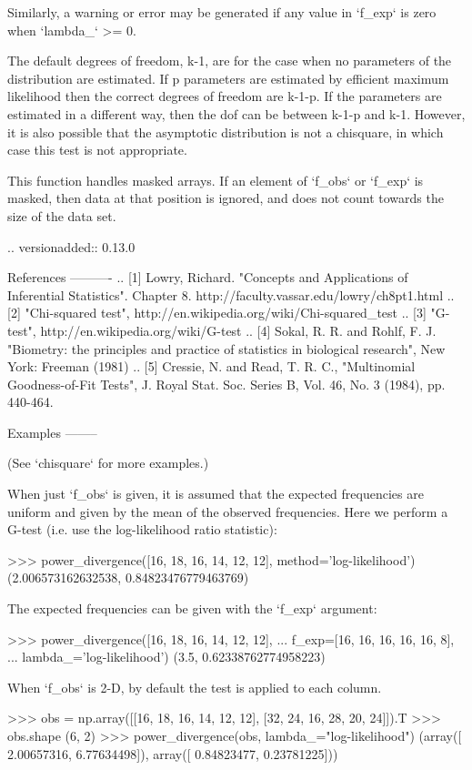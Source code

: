 \begin{DoxyVerb}
\begin{DoxyVerb}
Similarly, a warning or error may be generated if any value in `f_exp` is
zero when `lambda_` >= 0.

The default degrees of freedom, k-1, are for the case when no parameters
of the distribution are estimated. If p parameters are estimated by
efficient maximum likelihood then the correct degrees of freedom are
k-1-p. If the parameters are estimated in a different way, then the
dof can be between k-1-p and k-1. However, it is also possible that
the asymptotic distribution is not a chisquare, in which case this
test is not appropriate.

This function handles masked arrays.  If an element of `f_obs` or `f_exp`
is masked, then data at that position is ignored, and does not count
towards the size of the data set.

.. versionadded:: 0.13.0

References
----------
.. [1] Lowry, Richard.  "Concepts and Applications of Inferential
       Statistics". Chapter 8. http://faculty.vassar.edu/lowry/ch8pt1.html
.. [2] "Chi-squared test", http://en.wikipedia.org/wiki/Chi-squared_test
.. [3] "G-test", http://en.wikipedia.org/wiki/G-test
.. [4] Sokal, R. R. and Rohlf, F. J. "Biometry: the principles and
       practice of statistics in biological research", New York: Freeman
       (1981)
.. [5] Cressie, N. and Read, T. R. C., "Multinomial Goodness-of-Fit
       Tests", J. Royal Stat. Soc. Series B, Vol. 46, No. 3 (1984),
       pp. 440-464.

Examples
--------

(See `chisquare` for more examples.)

When just `f_obs` is given, it is assumed that the expected frequencies
are uniform and given by the mean of the observed frequencies.  Here we
perform a G-test (i.e. use the log-likelihood ratio statistic):

>>> power_divergence([16, 18, 16, 14, 12, 12], method='log-likelihood')
(2.006573162632538, 0.84823476779463769)

The expected frequencies can be given with the `f_exp` argument:

>>> power_divergence([16, 18, 16, 14, 12, 12],
...                  f_exp=[16, 16, 16, 16, 16, 8],
...                  lambda_='log-likelihood')
(3.5, 0.62338762774958223)

When `f_obs` is 2-D, by default the test is applied to each column.

>>> obs = np.array([[16, 18, 16, 14, 12, 12], [32, 24, 16, 28, 20, 24]]).T
>>> obs.shape
(6, 2)
>>> power_divergence(obs, lambda_="log-likelihood")
(array([ 2.00657316,  6.77634498]), array([ 0.84823477,  0.23781225]))


\end{DoxyVerb}
\end{DoxyVerb}
